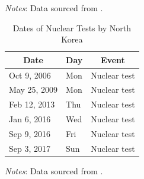 \documentclass[12pt,letterpaper]{scrartcl}
\begin{document}
\small
\noindent \emph{Notes}: Data sourced from  \citeyearpar{CSIS2023}.

\begin{table}[H]
\begin{minipage}{\hsize}
\centering
\small
\singlespacing
\caption{Dates of Nuclear Tests by North Korea}
\label{list_nuclear_tests}
\bigskip
\begin{tabular}{lll}\toprule
\multicolumn{1}{c}{Date} & \multicolumn{1}{c}{Day} & \multicolumn{1}{c}{Event} \\\midrule
Oct 9, 2006 & Mon & Nuclear test \\
May 25, 2009 & Mon & Nuclear test \\
Feb 12, 2013 & Thu & Nuclear test \\
Jan 6, 2016 & Wed & Nuclear test \\
Sep 9, 2016 & Fri & Nuclear test \\
Sep 3, 2017 & Sun & Nuclear test \\\bottomrule
\end{tabular}
\end{minipage}
\begin{minipage}{\hsize}
\bigskip
\small
\singlespacing
\emph{Notes}: Data sourced from  \citeyearpar{CSIS2023}.
\end{minipage}
\end{table}
\end{document}
